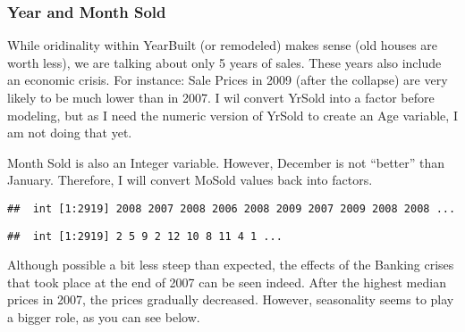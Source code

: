 \documentclass[]{article}
\newenvironment{Shaded}{\begin{snugshade}}{\end{snugshade}}
\newcommand{\KeywordTok}[1]{\textcolor[rgb]{0.13,0.29,0.53}{\textbf{#1}}}
\newcommand{\StringTok}[1]{\textcolor[rgb]{0.31,0.60,0.02}{#1}}
\newcommand{\OperatorTok}[1]{\textcolor[rgb]{0.81,0.36,0.00}{\textbf{#1}}}
\newcommand{\NormalTok}[1]{#1}
\begin{document}
\subsubsection{Year and Month Sold}\label{year-and-month-sold}

While oridinality within YearBuilt (or remodeled) makes sense (old
houses are worth less), we are talking about only 5 years of sales.
These years also include an economic crisis. For instance: Sale Prices
in 2009 (after the collapse) are very likely to be much lower than in
2007. I wil convert YrSold into a factor before modeling, but as I need
the numeric version of YrSold to create an Age variable, I am not doing
that yet.

Month Sold is also an Integer variable. However, December is not
``better'' than January. Therefore, I will convert MoSold values back
into factors.

\begin{Shaded}
\end{Shaded}

\begin{verbatim}
##  int [1:2919] 2008 2007 2008 2006 2008 2009 2007 2009 2008 2008 ...
\end{verbatim}

\begin{Shaded}
\end{Shaded}

\begin{verbatim}
##  int [1:2919] 2 5 9 2 12 10 8 11 4 1 ...
\end{verbatim}

\begin{Shaded}
\end{Shaded}

Although possible a bit less steep than expected, the effects of the
Banking crises that took place at the end of 2007 can be seen indeed.
After the highest median prices in 2007, the prices gradually decreased.
However, seasonality seems to play a bigger role, as you can see below.
\end{document}
